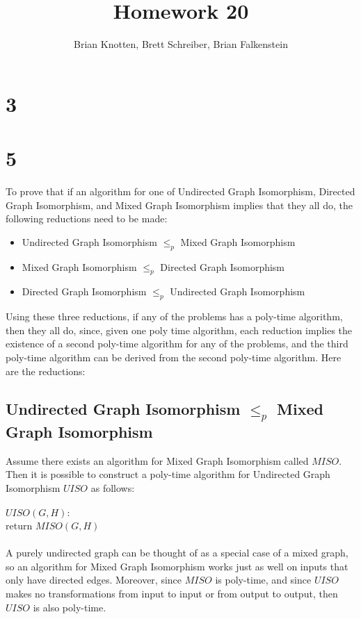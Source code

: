 \documentclass[letterpaper,notitlepage,twoside]{article}
\newcommand\tab[1][1cm]{\hspace*{#1}} %
\begin{document}
\title{Homework 20}
\author{Brian Knotten, Brett Schreiber, Brian Falkenstein}
\maketitle
\section*{3}

\section*{5}
To prove that if an algorithm for one of Undirected Graph Isomorphism, Directed Graph Isomorphism, and Mixed Graph Isomorphism implies that they all do, the following reductions need to be made:
\begin{itemize}
    \item Undirected Graph Isomorphism $\leq_p$ Mixed Graph Isomorphism
    \item Mixed Graph Isomorphism $\leq_p$ Directed Graph Isomorphism
    \item Directed Graph Isomorphism $\leq_p$ Undirected Graph Isomorphism
\end{itemize}
Using these three reductions, if any of the problems has a poly-time algorithm, then they all do, since, given one poly time algorithm, each reduction implies the existence of a second poly-time algorithm for any of the problems, and the third poly-time algorithm can be derived from the second poly-time algorithm.
Here are the reductions:
\subsection*{Undirected Graph Isomorphism $\leq_p$ Mixed Graph Isomorphism}
Assume there exists an algorithm for Mixed Graph Isomorphism called $MISO$. Then it is possible to construct a poly-time algorithm for Undirected Graph Isomorphism $UISO$ as follows:
\\\\
$UISO(G, H):$\\
\tab return $MISO(G, H)$
\\\\
A purely undirected graph can be thought of as a special case of a mixed graph, so an algorithm for Mixed Graph Isomorphism works just as well on inputs that only have directed edges. Moreover, since $MISO$ is poly-time, and since $UISO$ makes no transformations from input to input or from output to output, then $UISO$ is also poly-time.
\end{document}
